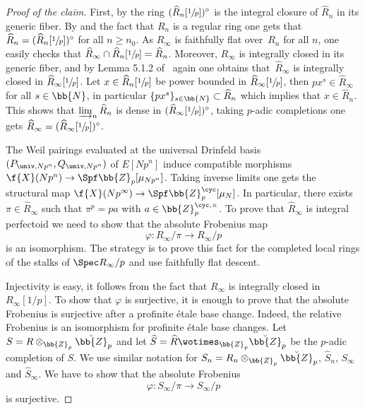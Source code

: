 \begin{proof}[Proof of the claim]
First, by \cite[Lem.\,A.2.2.3]{Heuer2019PerfectoidGO} the ring $(\widehat{R}_n[\sfrac{1}{p}])^{\circ}$ is the integral closure of $\widehat{R}_n$ in its generic fiber. By \cite[Lem.\,5.1.2]{BhattLectures} and the fact that $R_n$ is a regular ring one gets that $\widehat{R}_n=(\widehat{R}_n[\sfrac{1}{p}])^{\circ}$ for all $n\geq n_0$. As $R_{\infty}$ is faithfully flat over~$R_n$ for all $n$, one easily checks that $\widehat{R}_{\infty}\cap \widehat{R}_n[\sfrac{1}{p}]=\widehat{R}_{n}$. Moreover, $R_{\infty}$ is integrally closed in its generic fiber, and by Lemma 5.1.2 of \loccit\ again one obtains that~$\widehat{R}_{\infty}$ is integrally closed in $\widehat{R}_{\infty}[\sfrac{1}{p}]$. Let $x\in \widehat{R}_n[\sfrac{1}{p}]$ be power bounded in $\widehat{R}_{\infty}[\sfrac{1}{p}]$, then $px^s\in \widehat{R}_{\infty}$ for all $s\in \bb{N}$, in particular $\{px^s\}_{s\in \bb{N}}\subset \widehat{R}_n$ which implies that $x\in \widehat{R}_n$. This shows that $\varinjlim_{n} \widehat{R}_n$ is dense in $(\widehat{R}_{\infty}[\sfrac{1}{p}])^{\circ}$, taking $p$-adic completions one gets $\widehat{R}_{\infty}=(\widehat{R}_{\infty}[\sfrac{1}{p}])^{\circ}$.

The Weil pairings evaluated at the universal Drinfeld basis $(P_{\univ,Np^n},Q_{\univ,Np^n})$ of $E[Np^n]$ induce compatible morphisms $\f{X}(Np^n)\to \Spf \bb{Z}_p[\mu_{Np^n}]$. Taking inverse limits one gets the structural map $\f{X}(Np^\infty)\to \Spf \bb{Z}_p^{\cyc}[\mu_N]$. In particular, there exists $\pi\in \widehat{R}_{\infty}$ such that $\pi^p=pa$ with $a\in \bb{Z}_p^{\cyc,\times}$. To prove that $\widehat{R}_{\infty}$ is integral perfectoid we need to show that the absolute Frobenius map\vspace*{-3pt}
\[
\varphi: R_{\infty}/\pi \to R_{\infty}/p
\]
is an isomorphism. The strategy is to prove this fact for the completed local rings of the stalks of $\Spec R_{\infty}/p$ and use faithfully flat descent.

Injectivity is easy, it follows from the fact that $R_{\infty}$ is integrally closed in $R_{\infty}[1/p]$. To show that $\varphi$ is surjective, it is enough to prove that the absolute Frobenius is surjective after a profinite étale base change. Indeed, the relative Frobenius is an isomorphism for profinite étale base changes. Let $S= R\otimes_{\bb{Z}_p} \breve{\bb{Z}}_p$ and let $\widehat{S}= \widehat{R}\wotimes_{\bb{Z}_p} \breve{\bb{Z}}_p$ be the $p$-adic completion of $S$. We use similar notation for $S_n= R_n\otimes_{\bb{Z}_p} \breve{\bb{Z}}_p$, $\widehat{S}_n$, $S_\infty$ and $\widehat{S}_{\infty}$. We have to show that the absolute Frobenius\vspace*{-3pt}
\begin{equation*}
\varphi: S_{\infty}/\pi\to S_{\infty}/p
\end{equation*}
is surjective.


\end{proof}
